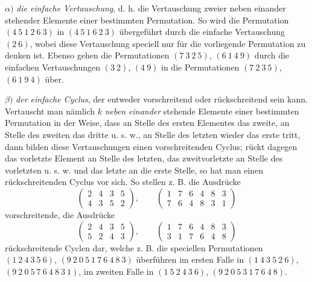 \documentclass[10pt]{article}
\begin{document}
\(\alpha)\) \emph{die einfache Vertauschung}, d. h. die Vertauschung zweier neben einander stehender Elemente einer bestimmten Permutation. So wird die Permutation \((4\ 5\ 1\ 2\ 6\ 3)\) in \((4\ 5\ 1\ 6\ 2\ 3)\) übergeführt durch die einfache Vertauschung \((2\ 6)\), wobei diese Vertauschung speciell nur für die vorliegende Permutation zu denken ist. Ebenso gehen die Permutationen \((7\ 3\ 2\ 5)\), \((6\ 1\ 4\ 9)\) durch die einfachen Vertauschungen \((3\ 2)\), \((4\ 9)\) in die Permutationen \((7\ 2\ 3\ 5)\), \((6\ 1\ 9\ 4)\) über.

\(\beta)\) \emph{der einfache Cyclus}, der entweder vorschreitend oder rückschreitend sein kann. Vertauscht man nämlich \(k\) \emph{neben einander} stehende Elemente einer bestimmten Permutation in der Weise, dass an Stelle des ersten Elementes das zweite, an Stelle des zweiten das dritte u. s. w., an Stelle des letzten wieder das erste tritt, dann bilden diese Vertauschungen einen vorschreitenden Cyclus; rückt dagegen das vorletzte Element an Stelle des letzten, das zweitvorletzte an Stelle des vorletzten u. s. w. und das letzte an die erste Stelle, so hat man einen rückschreitenden Cyclus vor sich. So stellen z. B. die Ausdrücke
\[
\begin{pmatrix}2&4&3&5\\4&3&5&2\end{pmatrix},\qquad
\begin{pmatrix}1&7&6&4&8&3\\7&6&4&8&3&1\end{pmatrix}
\]
vorschreitende, die Ausdrücke
\[
\begin{pmatrix}2&4&3&5\\5&2&4&3\end{pmatrix},\qquad
\begin{pmatrix}1&7&6&4&8&3\\3&1&7&6&4&8\end{pmatrix}
\]
rückschreitende Cyclen dar, welche z. B. die speciellen Permutationen \((1\ 2\ 4\ 3\ 5\ 6)\), \((9\ 2\ 0\ 5\ 1\ 7\ 6\ 4\ 8\ 3)\) überführen im ersten Falle in \((1\ 4\ 3\ 5\ 2\ 6)\), \((9\ 2\ 0\ 5\ 7\ 6\ 4\ 8\ 3\ 1)\), im zweiten Falle in \((1\ 5\ 2\ 4\ 3\ 6)\), \((9\ 2\ 0\ 5\ 3\ 1\ 7\ 6\ 4\ 8)\).
\end{document}
